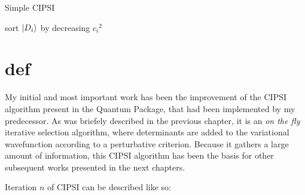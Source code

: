 \documentclass[./thesis.tex]{subfiles}
\begin{document}
\label{chap:CIPSI}


\begin{algorithm}
	\label{alg:cipsi_manu}
	\caption{Simple CIPSI}
		\KwData{ $\ket \Psi$ }
		sort $\ket {D_i}$ by decreasing ${c_i}^2$ \;
\end{algorithm}




\section{def}

My initial and most important work has been the improvement of the CIPSI algorithm present in the Quantum Package, that had been implemented by my predecessor\cite{giner:tel-01077016}. As was briefely described in the previous chapter, it is an \emph{on the fly} iterative selection algorithm, where determinants are added to the variational wavefunction according to a perturbative criterion. Because it gathers a large amount of information, this CIPSI algorithm has been the basis for other subsequent works presented in the next chapters.

Iteration $n$ of CIPSI can be described like so:
\end{document}
